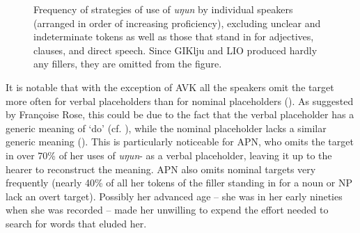 \documentclass[output=paper]{langscibook}
\begin{document}
\begin{figure}
\caption{Frequency of strategies of use of \textit{uŋun} by individual speakers (arranged in order of increasing proficiency), excluding unclear and indeterminate tokens as well as those that stand in for adjectives, clauses, and direct speech. Since GIKlju and LIO produced hardly any fillers, they are omitted from the figure.}
\label{fig:pakendorf:19}
\end{figure}

It is notable that with the exception of AVK all the speakers omit the target more often for verbal placeholders than for nominal placeholders (). As suggested by Françoise Rose, this could be due to the fact that the verbal placeholder has a generic meaning of ‘do’ (cf. ), while the nominal placeholder lacks a similar generic meaning (). This is particularly noticeable for APN, who omits the target in over 70\% of her uses of \textit{uŋun}- as a verbal placeholder, leaving it up to the hearer to reconstruct the meaning. APN also omits nominal targets very frequently (nearly 40\% of all her tokens of the filler standing in for a noun or NP lack an overt target). Possibly her advanced age – she was in her early nineties when she was recorded – made her unwilling to expend the effort needed to search for words that eluded her.
\end{document}
